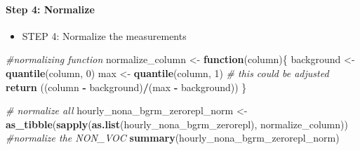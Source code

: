 \documentclass[
]{article}
\newenvironment{Shaded}{\begin{snugshade}}{\end{snugshade}}
\newcommand{\CommentTok}[1]{\textcolor[rgb]{0.56,0.35,0.01}{\textit{#1}}}
\newcommand{\ControlFlowTok}[1]{\textcolor[rgb]{0.13,0.29,0.53}{\textbf{#1}}}
\newcommand{\DecValTok}[1]{\textcolor[rgb]{0.00,0.00,0.81}{#1}}
\newcommand{\FunctionTok}[1]{\textcolor[rgb]{0.13,0.29,0.53}{\textbf{#1}}}
\newcommand{\NormalTok}[1]{#1}
\newcommand{\OtherTok}[1]{\textcolor[rgb]{0.56,0.35,0.01}{#1}}
\newcommand{\SpecialCharTok}[1]{\textcolor[rgb]{0.81,0.36,0.00}{\textbf{#1}}}
\providecommand{\tightlist}{%
  \setlength{\itemsep}{0pt}\setlength{\parskip}{0pt}}
\begin{document}
\paragraph{Step 4: Normalize}\label{step-4-normalize}

\begin{itemize}
\tightlist
\item
  STEP 4: Normalize the measurements
\end{itemize}

\begin{Shaded}
\begin{Highlighting}[]
\CommentTok{\#normalizing function}
\NormalTok{normalize\_column }\OtherTok{\textless{}{-}} \ControlFlowTok{function}\NormalTok{(column)\{}
\NormalTok{  background }\OtherTok{\textless{}{-}} \FunctionTok{quantile}\NormalTok{(column, }\DecValTok{0}\NormalTok{)}
\NormalTok{  max }\OtherTok{\textless{}{-}} \FunctionTok{quantile}\NormalTok{(column, }\DecValTok{1}\NormalTok{) }\CommentTok{\# this could be adjusted}
  \FunctionTok{return}\NormalTok{ ((column }\SpecialCharTok{{-}}\NormalTok{ background)}\SpecialCharTok{/}\NormalTok{(max }\SpecialCharTok{{-}}\NormalTok{ background))}
\NormalTok{\}}
\end{Highlighting}
\end{Shaded}

\begin{Shaded}
\begin{Highlighting}[]
\CommentTok{\# normalize all}
\NormalTok{hourly\_nona\_bgrm\_zerorepl\_norm }\OtherTok{\textless{}{-}} \FunctionTok{as\_tibble}\NormalTok{(}\FunctionTok{sapply}\NormalTok{(}\FunctionTok{as.list}\NormalTok{(hourly\_nona\_bgrm\_zerorepl),}
\NormalTok{                                                   normalize\_column))}
\CommentTok{\#normalize the NON\_VOC}
\FunctionTok{summary}\NormalTok{(hourly\_nona\_bgrm\_zerorepl\_norm)}
\end{Highlighting}
\end{Shaded}
\end{document}
